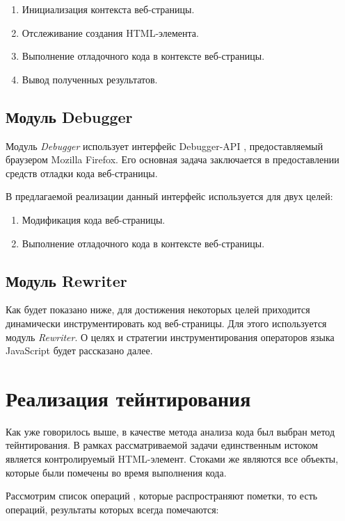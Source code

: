 	\begin{enumerate}
		\item Инициализация контекста веб-страницы.
		\item Отслеживание создания HTML-элемента.
		\item Выполнение отладочного кода в контексте веб-страницы.
		\item Вывод полученных результатов.
	\end{enumerate}

\subsection{Модуль Debugger}
	Модуль \textit{Debugger} использует интерфейс Debugger-API \cite{debuggerapi}, предоставляемый браузером Mozilla Firefox. Его основная задача заключается в предоставлении средств отладки кода веб-страницы.


	В предлагаемой реализации данный интерфейс используется для двух целей:


	\begin{enumerate}
		\item Модификация кода веб-страницы.
		\item Выполнение отладочного кода в контексте веб-страницы.
	\end{enumerate}

\subsection{Модуль Rewriter}
	Как будет показано ниже, для достижения некоторых целей приходится динамически инструментировать код веб-страницы. Для этого используется модуль \textit{Rewriter}. О целях и стратегии инструментирования операторов языка JavaScript будет рассказано далее.

\section{Реализация тейнтирования}
Как уже говорилось выше, в качестве метода анализа кода был выбран метод тейнтирования. В рамках рассматриваемой задачи единственным истоком является контролируемый HTML-элемент. Стоками же являются все объекты, которые были помечены во время выполнения кода.


Рассмотрим список операций \cite{miller}, которые распространяют пометки, то есть операций, результаты которых всегда помечаются:


